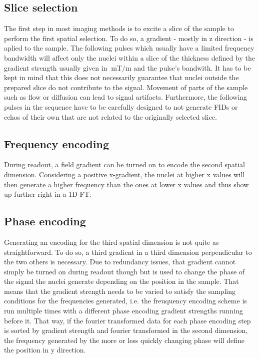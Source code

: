 		\subsection{Slice selection}
			The first step in most imaging methods is to excite a slice of the sample to perform the
			first spatial selection. To do so, a gradient - mostly in z direction - is aplied to the
			sample. The following pulses which usually have a limited frequency bandwidth will
			affect only the nuclei within a slice of the thickness defined by the gradient strength
			usually given in $\SI{}{\milli\tesla\per\meter}$ and the pulse's bandwith. It has to be
			kept in mind that this does not necessarily guarantee that nuclei outside the prepared
			slice do not contribute to the signal. Movement of parts of the sample such as flow or
			diffusion can lead to signal artifacts. Furthermore, the following pulses in the
			sequence have to be carefully designed to not generate FIDs or echos of their own that
			are not related to the originally selected slice.
		\subsection{Frequency encoding}
			During readout, a field gradient can be turned on to encode the second spatial
			dimension. Considering a positive x-gradient, the nuclei at higher x values will then
			generate a higher frequency than the ones at lower x values and thus show up further
			right in a 1D-FT.
		\subsection{Phase encoding}
			Generating an encoding for the third spatial dimension is not quite as straightforward.
			To do so, a third gradient in a third dimension perpendicular to the two others is necessary.
			Due to redundancy issues, that gradient cannot simply be turned on during readout though
			but is used to change the phase of the signal the nuclei generate depending on the
			position in the sample. That means that the gradient strength needs to be varied to
			satisfy the sampling conditions for the frequencies generated, i.e. the freuquency
			encoding scheme is run multiple times with a different phase encoding gradient strengths running
			before it. That way, if the fourier transformed data for each phase encoding step is
			sorted by gradient strength and fourier transformed in the second dimension, the
			frequency generated by the more or less quickly changing phase will define the position
			in y direction.
